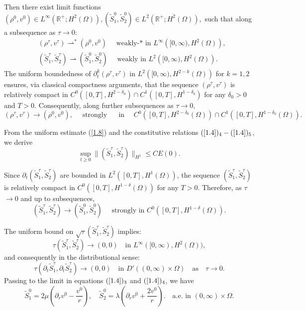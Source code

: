 \documentclass[10pt,reqno]{amsart}
\numberwithin{equation}{section}
\begin{document}
	Then there exist limit functions
	$
	(\rho^{0},v^{0}) \in L^{\infty}\left(\mathbb{R}^{+} ; H^2(\Omega)\right), (\tilde{S}_1^{0},\tilde{S}_2^{0}) \in L^2\left(\mathbb{R}^{+} ; H^2(\Omega)\right),
	$
	such that along a subsequence as $\tau\rightarrow 0$:
	\begin{equation}
		\begin{aligned}
			& \left(\rho^{\tau},v^{\tau}\right) \rightharpoonup^*\left(\rho^{0},v^{0}\right) \quad \text { weakly-* in } L^{\infty}\left([0,\infty), H^2(\Omega)\right), \\
			& \left(\tilde{S}_1^{\tau},\tilde{S}_2^{\tau}\right) \rightharpoonup\left(\tilde{S}_1^{0},\tilde{S}_2^{0}\right) \quad \text { weakly in } L^2\left([0,\infty), H^2(\Omega)\right) .
		\end{aligned}
	\end{equation}
	The uniform boundedness of $\partial_{t}^k(\rho^{\tau},v^{\tau})$ in $L^2\left([0,\infty), H^{2-k}(\Omega)\right)$ for $k=1,2$ ensures, via classical compactness arguments, that the sequence $(\rho^{\tau},v^{\tau})$ is relatively compact in
	$C^0\left([0, T], H^{2-\delta_0}\right) \cap C^1\left([0, T], H^{1-\delta_0}\right)$ for any $\delta_0>0$ and $T>0$. Consequently, along further subsequences as $\tau$$\rightarrow$0, 
	$$
	(\rho^\tau,v^\tau) \rightarrow(\rho^0,v^0), \quad \text { strongly } \quad \text { in } \quad C^0\left([0, T], H^{2-\delta_0}(\Omega)\right) \cap C^1\left([0, T], H^{1-\delta_0}(\Omega)\right).
	$$
	
	From the uniform estimate (\ref{1.8}) and the constitutive relations $(\ref{1.4})_4-(\ref{1.4})_5$, we derive  
	$$
	\sup_{t \geq 0} \|(\tilde{S}_1^\tau, \tilde{S}_2^\tau)\|_{H^1} \leq C E(0).
	$$
	
	Since $\partial_{t}(\tilde{S}_1^{\tau},\tilde{S}_2^{\tau})$ are bounded in $L^2([0,T], H^1(\Omega))$,
	the sequence $(\tilde{S}_1^{\tau},\tilde{S}_2^{\tau})$ is relatively compact in $C^0\left([0, T], H^{1-\delta}(\Omega)\right)$
	for any $T > 0$. Therefore, as $\tau$$\rightarrow$0 and up to subsequences,
	$$
	\left(\tilde{S}_1^{\tau},\tilde{S}_2^{\tau}\right) \rightarrow\left(\tilde{S}_1^{0},\tilde{S}_2^{0}\right) \quad \text { strongly in } C^0\left([0, T], H^{1-\delta}(\Omega)\right).
	$$
	
	The uniform bound on $\sqrt{\tau}(\tilde{S}_1^{\tau},\tilde{S}_2^{\tau})$ implies:
	\[
	\tau(\tilde{S}_1^{\tau},\tilde{S}_2^{\tau}) \to (0, 0) \quad \text{in } L^\infty([0, \infty), H^2(\Omega)),
	\]
	and consequently in the distributional sense:
	\[
	\tau (\partial_t\tilde{S}_1^\tau, \partial_t \tilde{S}_2^\tau) \to (0, 0) \quad \text{in } D'((0, \infty) \times \Omega)
	\quad \text{as} \quad \tau\rightarrow0.
	\]
	Passing to the limit in equations $(\ref{1.4})_3$ and $(\ref{1.4})_4$, we have
	\begin{equation}\label{4.3}
		\tilde{S}_1^0=2\mu(\partial_{r}v^0-\frac{v^0}{r}), \quad \tilde{S}_2^0=\lambda(\partial_{r}v^0+\frac{2v^0}{r}). \quad \text{a.e. in } (0, \infty) \times \Omega.
	\end{equation}
	
\end{document}
